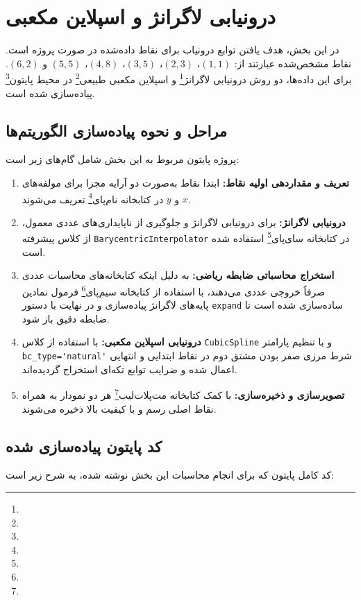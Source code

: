  \section{درونیابی لاگرانژ و اسپلاین مکعبی}
 در این بخش، هدف یافتن توابع درونیاب برای نقاط داده‌شده در صورت پروژه است. نقاط مشخص‌شده عبارتند از:
 $ (1,1) $، $ (2,3) $، $ (3,5) $، $ (4,8) $، $ (5,5) $ و $ (6,2) $.
 برای این داده‌ها، دو روش درونیابی لاگرانژ\footnote{} و اسپلاین مکعبی طبیعی\footnote{} در محیط پایتون\footnote{} پیاده‌سازی شده است.
 
 \subsection{مراحل و نحوه پیاده‌سازی الگوریتم‌ها}
 پروژه پایتون مربوط به این بخش شامل گام‌های زیر است:
 \begin{enumerate}
  \item \textbf{تعریف و مقداردهی اولیه نقاط:} ابتدا نقاط به‌صورت دو آرایه مجزا برای مولفه‌های $ x $ و $ y $ در کتابخانه نام‌پای\footnote{} تعریف می‌شوند.
  \item \textbf{درونیابی لاگرانژ:} برای درونیابی لاگرانژ و جلوگیری از ناپایداری‌های عددی معمول، از کلاس پیشرفته \lstinline|BarycentricInterpolator| در کتابخانه سای‌پای\footnote{} استفاده شده است.
  \item \textbf{استخراج محاسباتی ضابطه ریاضی:} به دلیل اینکه کتابخانه‌های محاسبات عددی صرفاً خروجی عددی می‌دهند، با استفاده از کتابخانه سیم‌پای\footnote{} فرمول نمادین پایه‌های لاگرانژ پیاده‌سازی و در نهایت با دستور \lstinline|expand| ساده‌سازی شده است تا ضابطه دقیق باز شود.
  \item \textbf{درونیابی اسپلاین مکعبی:} با استفاده از کلاس \lstinline|CubicSpline| و با تنظیم پارامتر \lstinline|bc_type='natural'| شرط مرزی صفر بودن مشتق دوم در نقاط ابتدایی و انتهایی اعمال شده و ضرایب توابع تکه‌ای استخراج گردیده‌اند.
  \item \textbf{تصویرسازی و ذخیره‌سازی:} با کمک کتابخانه مت‌پلات‌لیب\footnote{} هر دو نمودار به همراه نقاط اصلی رسم و با کیفیت بالا ذخیره می‌شوند.
 \end{enumerate}
 
 \subsection{کد پایتون پیاده‌سازی شده}
 کد کامل پایتون که برای انجام محاسبات این بخش نوشته شده، به شرح زیر است:
 
